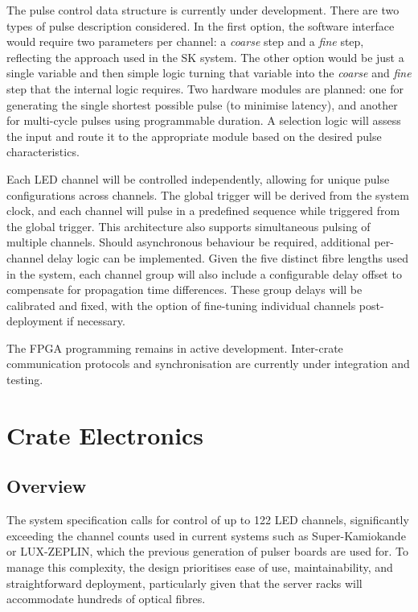 \documentclass[a4paper,11pt]{article}
\begin{document}
The pulse control data structure is currently under development. There are two types of pulse description considered. In the first option, the software interface would require two parameters per channel: a \textit{coarse} step and a \textit{fine} step, reflecting the approach used in the SK system. The other option would be just a single variable and then simple logic turning that variable into the \textit{coarse} and \textit{fine} step that the internal logic requires. Two hardware modules are planned: one for generating the single shortest possible pulse (to minimise latency), and another for multi-cycle pulses using programmable duration. A selection logic will assess the input and route it to the appropriate module based on the desired pulse characteristics.

Each LED channel will be controlled independently, allowing for unique pulse configurations across channels. The global trigger will be derived from the system clock, and each channel will pulse in a predefined sequence while triggered from the global trigger. This architecture also supports simultaneous pulsing of multiple channels. Should asynchronous behaviour be required, additional per-channel delay logic can be implemented. Given the five distinct fibre lengths used in the system, each channel group will also include a configurable delay offset to compensate for propagation time differences. These group delays will be calibrated and fixed, with the option of fine-tuning individual channels post-deployment if necessary.

The FPGA programming remains in active development. Inter-crate communication protocols and synchronisation are currently under integration and testing.

\section{Crate Electronics}\label{sec:crate}

\subsection{Overview}

The system specification calls for control of up to 122 LED channels, significantly exceeding the channel counts used in current systems such as Super-Kamiokande or LUX-ZEPLIN, which the previous generation of pulser boards are used for. To manage this complexity, the design prioritises ease of use, maintainability, and straightforward deployment, particularly given that the server racks will accommodate hundreds of optical fibres.
\end{document}
